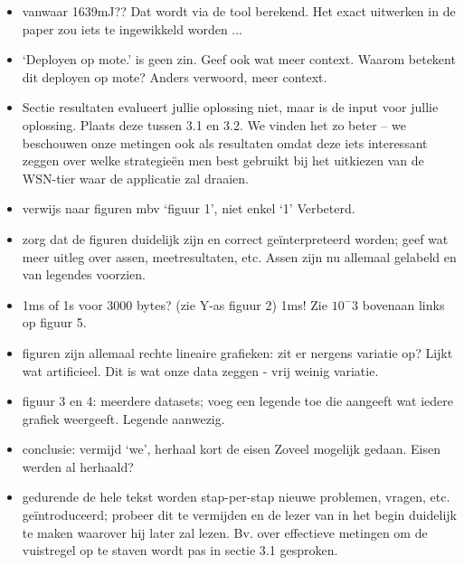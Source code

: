 \documentclass[11pt]{article}
\begin{document}
\begin{itemize}
\item vanwaar 1639mJ?? {\color{red} Dat wordt via de tool berekend. Het exact uitwerken in de paper zou iets te ingewikkeld worden ...}
\item ‘Deployen op mote.’ is geen zin. Geef ook wat meer context. Waarom betekent dit deployen op mote? {\color{red} Anders verwoord, meer context.}
\item Sectie resultaten evalueert jullie oplossing niet, maar is de input voor jullie oplossing. Plaats deze tussen 3.1 en 3.2. {\color{red} We vinden het zo beter -- we beschouwen onze metingen ook als resultaten omdat deze iets interessant zeggen over welke strategie\"en men best gebruikt bij het uitkiezen van de WSN-tier waar de applicatie zal draaien.}
\item verwijs naar figuren mbv ‘figuur 1’, niet enkel ‘1’ {\color{red} Verbeterd.}
\item zorg dat de figuren duidelijk zijn en correct geïnterpreteerd worden; geef wat meer uitleg over assen, meetresultaten, etc. {\color{red} Assen zijn nu allemaal gelabeld en van legendes voorzien.}
\item 1ms of 1s voor 3000 bytes? (zie Y-as figuur 2) {\color{red} 1ms! Zie $10^-3$ bovenaan links op figuur 5.}
\item figuren zijn allemaal rechte lineaire grafieken: zit er nergens variatie op? Lijkt wat artificieel. {\color{red} Dit is wat onze data zeggen - vrij weinig variatie.}
\item figuur 3 en 4: meerdere datasets; voeg een legende toe die aangeeft wat iedere grafiek weergeeft. {\color{red} Legende aanwezig.}
\item conclusie: vermijd ‘we’, herhaal kort de eisen {\color{red} Zoveel mogelijk gedaan. Eisen werden al herhaald?}

\item gedurende de hele tekst worden stap-per-stap nieuwe problemen, vragen, etc. geïntroduceerd; probeer dit te vermijden en de lezer van in het begin duidelijk te maken waarover hij later zal lezen. Bv. over effectieve metingen om de vuistregel op te staven wordt pas in sectie 3.1 gesproken.
\end{itemize}
\end{document}
